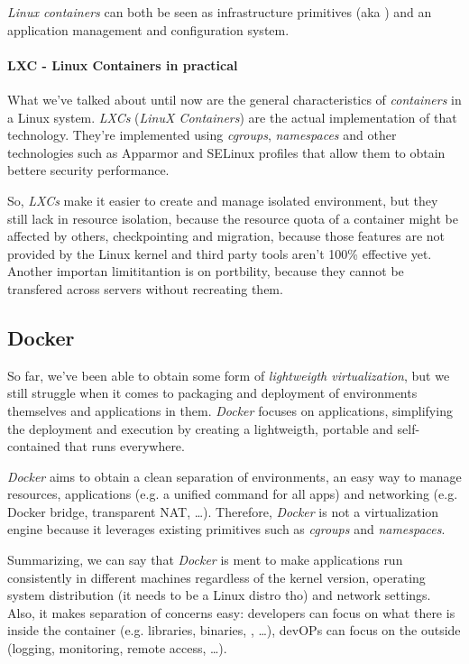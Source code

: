 \begin{note}
    \emph{Linux containers} can both be seen as infrastructure primitives
    (aka ) and an application management and configuration
    system.
\end{note}

\paragraph{LXC - Linux Containers in practical}
What we've talked about until now are the general characteristics of
\emph{containers} in a Linux system. \emph{LXCs} (\emph{LinuX Containers}) are
the actual implementation of that technology. They're implemented using
\emph{cgroups}, \emph{namespaces} and other technologies such as Apparmor and
SELinux profiles that allow them to obtain bettere security performance.

So, \emph{LXCs} make it easier to create and manage isolated environment, but
they still lack in resource isolation, because the resource quota of a container
might be affected by others, checkpointing and migration, because those features
are not provided by the Linux kernel and third party tools aren't 100\% effective
yet. Another importan limititantion is on portbility, because they cannot be
transfered across servers without recreating them.

\subsection{Docker}
So far, we've been able to obtain some form of \emph{lightweigth virtualization},
but we still struggle when it comes to packaging and deployment of environments
themselves and applications in them. \emph{Docker} focuses on applications,
simplifying the deployment and execution by creating a lightweigth, portable
and self-contained  that runs everywhere.

\emph{Docker} aims to obtain a clean separation of environments, an easy
way to manage resources, applications (e.g. a unified  command for all
apps) and networking (e.g. Docker bridge, transparent NAT, \dots). Therefore,
\emph{Docker} is not a virtualization engine because it leverages existing
primitives such as \emph{cgroups} and \emph{namespaces}.

Summarizing, we can say that \emph{Docker} is ment to make applications run
consistently in different machines regardless of the kernel version, operating
system distribution (it needs to be a Linux distro tho) and network settings.
Also, it makes separation of concerns easy: developers can focus on what there
is inside the container (e.g. libraries, binaries, , \dots), devOPs
can focus on the outside (logging, monitoring, remote access, \dots).

